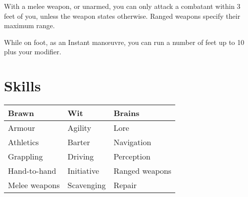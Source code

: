 \documentclass[10pt, a4paper, twocolumn]{article}
\begin{document}
With a melee weapon, or unarmed, you can only attack a combatant within 3 feet of you, unless the weapon states otherwise. Ranged weapons specify their maximum range.

While on foot, as an Instant man\oe{}uvre, you can run a number of feet up to 10 plus your  modifier.

\clearpage
\subtitle{Lists and Tables}
\compacttitle

\section{Skills}
{\small\begin{tabular}{lll}
  Brawn         & Wit        & Brains         \\
  \hline
  Armour        & Agility    & Lore           \\
  Athletics     & Barter     & Navigation     \\
  Grappling     & Driving    & Perception     \\
  Hand-to-hand  & Initiative & Ranged weapons \\
  Melee weapons & Scavenging & Repair
\end{tabular}}
\end{document}
